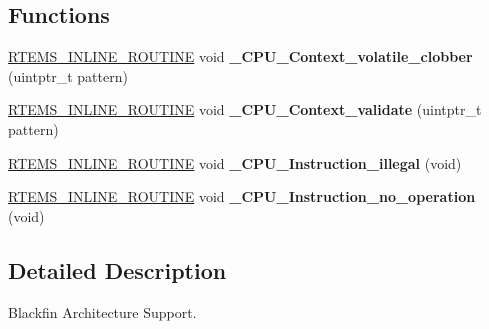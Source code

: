 \subsection*{Functions}
\begin{DoxyCompactItemize}
\item 
\mbox{\label{group__RTEMSScoreCPUBfin_gaeb1ddd8f84f82b13fad2a05a3e7d0ab7}} 
\mbox{\hyperlink{group__RTEMSScoreBaseDefs_gac216239df231d5dbd15e3520b0b9313f}{R\+T\+E\+M\+S\+\_\+\+I\+N\+L\+I\+N\+E\+\_\+\+R\+O\+U\+T\+I\+NE}} void {\bfseries \+\_\+\+C\+P\+U\+\_\+\+Context\+\_\+volatile\+\_\+clobber} (uintptr\+\_\+t pattern)
\item 
\mbox{\label{group__RTEMSScoreCPUBfin_gaae027d9a906bb67d38ebd7a9104b976b}} 
\mbox{\hyperlink{group__RTEMSScoreBaseDefs_gac216239df231d5dbd15e3520b0b9313f}{R\+T\+E\+M\+S\+\_\+\+I\+N\+L\+I\+N\+E\+\_\+\+R\+O\+U\+T\+I\+NE}} void {\bfseries \+\_\+\+C\+P\+U\+\_\+\+Context\+\_\+validate} (uintptr\+\_\+t pattern)
\item 
\mbox{\label{group__RTEMSScoreCPUBfin_ga07618c93359f2485af2e98a96b330208}} 
\mbox{\hyperlink{group__RTEMSScoreBaseDefs_gac216239df231d5dbd15e3520b0b9313f}{R\+T\+E\+M\+S\+\_\+\+I\+N\+L\+I\+N\+E\+\_\+\+R\+O\+U\+T\+I\+NE}} void {\bfseries \+\_\+\+C\+P\+U\+\_\+\+Instruction\+\_\+illegal} (void)
\item 
\mbox{\label{group__RTEMSScoreCPUBfin_gab683a0a37a089e2a0fd3c356836d5499}} 
\mbox{\hyperlink{group__RTEMSScoreBaseDefs_gac216239df231d5dbd15e3520b0b9313f}{R\+T\+E\+M\+S\+\_\+\+I\+N\+L\+I\+N\+E\+\_\+\+R\+O\+U\+T\+I\+NE}} void {\bfseries \+\_\+\+C\+P\+U\+\_\+\+Instruction\+\_\+no\+\_\+operation} (void)
\end{DoxyCompactItemize}


\subsection{Detailed Description}
Blackfin Architecture Support. 

